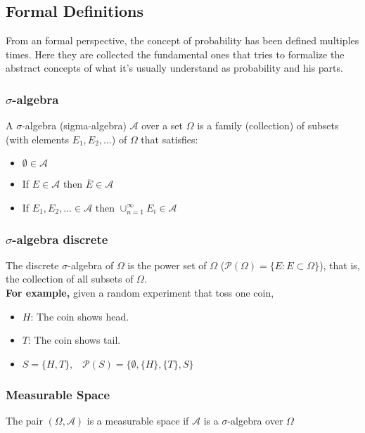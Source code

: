 \subsection{Formal Definitions}
From an formal perspective, the concept of probability has been defined multiples times. Here they are collected the fundamental ones that tries
to formalize the abstract concepts of what it's usually understand as probability and his parts.

\subsubsection{$\sigma$-algebra}
A $\sigma$-algebra (sigma-algebra) $\mathcal{A}$ over a set $\Omega$ is a family (collection) of subsets (with elements $E_1, E_2, \dots$) of $\Omega$ that satisfies:
\begin{itemize}
    \item $\emptyset \in \mathcal{A}$
    \item If $E \in \mathcal{A}$ then $\overline{E} \in \mathcal{A}$
    \item If $E_1, E_2, \dots \in \mathcal{A}$ then $\cup_{n=1}^{\infty}E_i \in \mathcal{A}$ 
\end{itemize} 

\subsubsection{$\sigma$-algebra discrete} 
The discrete $\sigma$-algebra of $\Omega$ is the power set of $\Omega$ ($\mathcal{P}(\Omega)=\{E : E \subset \Omega\}$), that is, the collection
of all subsets of $\Omega$.\\

\textbf{For example,} given a random experiment that toss one coin,
\begin{itemize}
    \item[] $H$: The coin shows head.
    \item[] $T$: The coin shows tail. 
    \item[] $S = \{H, T\},\;\;\; \mathcal{P}(S)=\{\emptyset, \{H\}, \{T\}, S\}$
\end{itemize}

\subsubsection{Measurable Space}
The pair $(\Omega, \mathcal{A})$ is a measurable space if $\mathcal{A}$ is a $\sigma$-algebra over $\Omega$


